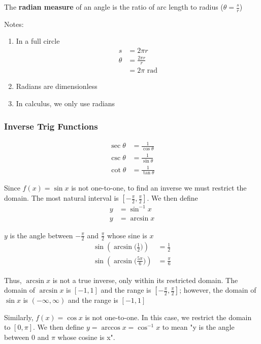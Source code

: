\documentclass[12pt]{article}
\begin{document}
The {\bf radian measure} of an angle is the ratio of arc length to radius ($\theta = \frac{s}{r}$)

Notes:
\begin{enumerate}
\item In a full circle \begin{align*}
                         s &= 2\pi r\\
                         \theta &= \frac{2\pi r}{r}\\
                         &= 2\pi \text{ rad}
                       \end{align*}
\item Radians are dimensionless
\item In calculus, we only use radians
\end{enumerate}

\subsubsection*{Inverse Trig Functions}
\begin{align*}
\sec\theta &= \frac{1}{\cos\theta}\\
\csc\theta &= \frac{1}{\sin\theta}\\
\cot\theta &= \frac{1}{\tan\theta}
\end{align*}

Since $f(x)=\sin x$ is not one-to-one, to find an inverse we must restrict the domain. The most natural interval is $[-\frac{\pi}{2},\frac{\pi}{2}]$. We then define
\begin{align*}
y &= \sin^{-1}x\\
y &= \arcsin x
\end{align*}

$y$ is the angle between $-\frac{\pi}{2}$ and $\frac{\pi}{2}$ whose sine is $x$
\begin{align*}
\sin(\arcsin\bigg(\frac{1}{2}\bigg)) &= \frac{1}{2}\\
\sin(\arcsin\bigg(\frac{5\pi}{6}\bigg)) &= \frac{\pi}{6}
\end{align*}

Thus, $\arcsin x$ is not a true inverse, only within its restricted domain. The domain of $\arcsin x$ is $[-1,1]$ and the range is $[-\frac{\pi}{2},\frac{\pi}{2}]$; however, the domain of $\sin x$ is $(-\infty,\infty)$ and the range is $[-1,1]$

Similarly, $f(x) = \cos x$ is not one-to-one. In this case, we restrict the domain to $[0,\pi]$. We then define $y=\arccos x=\cos^{-1}x$ to mean "y is the angle between 0 and $\pi$ whose cosine is x".
\end{document}
